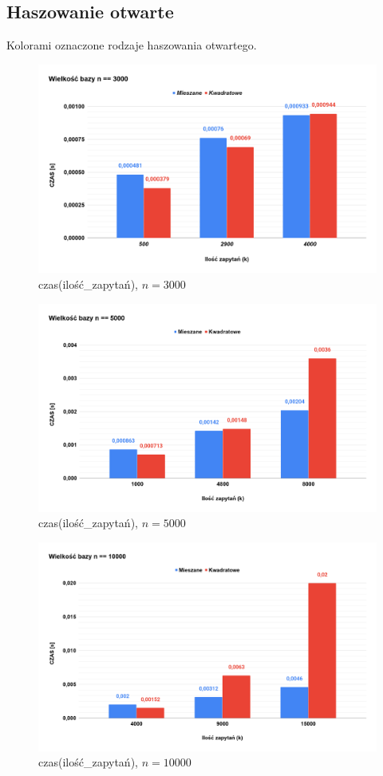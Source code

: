 \documentclass{article}
\begin{document}
\subsection{Haszowanie otwarte}
\indent
Kolorami oznaczone rodzaje haszowania otwartego. 

\begin{figure}[H]
	\centering
	\includegraphics[scale=0.22]{mkn3k.png}
	\caption{czas(ilość\_zapytań), $n = 3000$}
	\label{fig:mkn3k}
\end{figure}
\begin{figure}[H]
	\centering
	\includegraphics[scale=0.21]{mkn5k.png}
	\caption{czas(ilość\_zapytań), $n = 5000$}
	\label{fig:mkn5k}
\end{figure}
\begin{figure}[H]
	\includegraphics[scale=0.22]{mkn10k.png}
	\caption{czas(ilość\_zapytań), $n = 10000$}
	\label{fig:mkn10k}
\end{figure}
\end{document}
